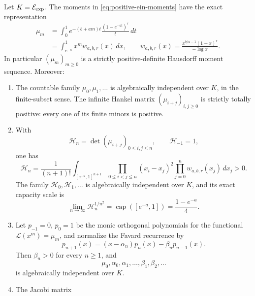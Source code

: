 \begin{theorem}
\label{thm:positive-ein-jacobi}
Let $K=\mathcal E_{\mathrm{exp}}$.  The moments in
\eqref{eq:positive-ein-moments} have the exact representation
\begin{align}
 \mu_m
 &=\int_0^1 e^{-(b+am)t}\frac{(1-e^{-at})^r}{t}\,dt
 \label{eq:positive-ein-laplace}\\
 &=\int_{e^{-a}}^1 x^m w_{a,b,r}(x)\,dx,
 \qquad
 w_{a,b,r}(x)=
 \frac{x^{b/a-1}(1-x)^r}{-\log x}.
 \label{eq:positive-ein-weight}
\end{align}
In particular $(\mu_m)_{m\geq0}$ is a strictly positive-definite
Hausdorff moment sequence.  Moreover:
\begin{enumerate}
\item The countable family $\mu_0,\mu_1,\ldots$ is algebraically
independent over $K$, in the finite-subset sense.  The infinite Hankel
matrix $(\mu_{i+j})_{i,j\geq0}$ is strictly totally positive: every one
of its finite minors is positive.
\item With
\begin{equation}\label{eq:positive-ein-Hankel}
 \mathcal H_n=\det(\mu_{i+j})_{0\leq i,j\leq n},
 \qquad \mathcal H_{-1}=1,
\end{equation}
one has
\begin{equation}\label{eq:positive-ein-Heine}
 \mathcal H_n=
 \frac1{(n+1)!}
 \int_{[e^{-a},1]^{n+1}}
 \prod_{0\leq i<j\leq n}(x_i-x_j)^2
 \prod_{j=0}^n w_{a,b,r}(x_j)\,dx_j>0.
\end{equation}
The family $\mathcal H_0,\mathcal H_1,\ldots$ is algebraically
independent over $K$, and its exact capacity scale is
\begin{equation}\label{eq:positive-ein-Hankel-capacity}
 \lim_{n\to\infty}\mathcal H_n^{1/n^2}
 =\operatorname{cap}([e^{-a},1])=\frac{1-e^{-a}}4.
\end{equation}
\item Let $p_{-1}=0$, $p_0=1$ be the monic orthogonal polynomials for
the functional $\mathcal L(x^m)=\mu_m$, and normalize the Favard
recurrence by
\begin{equation}\label{eq:positive-ein-Favard}
 p_{n+1}(x)=(x-\alpha_n)p_n(x)-\beta_np_{n-1}(x).
\end{equation}
Then $\beta_n>0$ for every $n\geq1$, and
\[
 \mu_0,\alpha_0,\alpha_1,\ldots,
 \beta_1,\beta_2,\ldots
\]
is algebraically independent over $K$.
\item The Jacobi matrix
\begin{equation}\label{eq:positive-ein-Jacobi}

\end{equation}
\end{enumerate}
\end{theorem}
